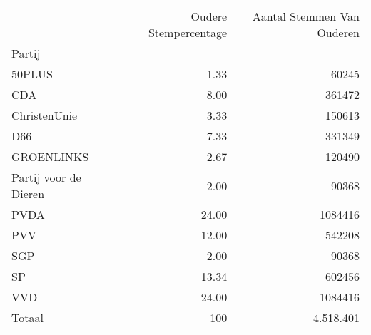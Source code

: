 \begin{tabular}{lrr}
\toprule
{} &  Oudere Stempercentage &  Aantal Stemmen Van Ouderen \\
Partij                &                        &                             \\
\midrule
50PLUS                &                   1.33 &                       60245 \\
CDA                   &                   8.00 &                      361472 \\
ChristenUnie          &                   3.33 &                      150613 \\
D66                   &                   7.33 &                      331349 \\
GROENLINKS            &                   2.67 &                      120490 \\
Partij voor de Dieren &                   2.00 &                       90368 \\
PVDA                  &                  24.00 &                     1084416 \\
PVV                   &                  12.00 &                      542208 \\
SGP                   &                   2.00 &                       90368 \\
SP                    &                  13.34 &                      602456 \\
VVD                   &                  24.00 &                     1084416 \\
\midrule
Totaal				&				100		&						4.518.401\\
\bottomrule
\end{tabular}
